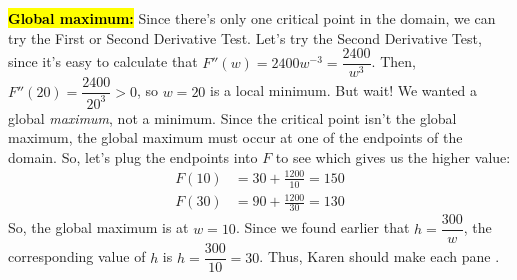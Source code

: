 \documentclass{article}
\newcommand{\highlight}[1]{\boldmath\hl{\textbf{#1}}\unboldmath}
\theoremstyle{theorem}
\begin{document}
\begin{enumerate}
\begin{solution}
    \highlight{Global maximum:} Since there's only one critical point in the domain, we can try the First or Second Derivative Test. Let's try the Second Derivative Test, since it's easy to calculate that $F''(w) = 2400 w^{-3} = \dfrac{2400}{w^3}$. Then, $F''(20) = \dfrac{2400}{20^3} > 0$, so $w = 20$ is a local minimum. But wait! We wanted a global \emph{maximum}, not a minimum. Since the critical point isn't the global maximum, the global maximum must occur at one of the endpoints of the domain. So, let's plug the endpoints into $F$ to see which gives us the higher value:
    \begin{align*}
      F(10) &= 30 + \frac{1200}{10} = 150 \\
      F(30) &= 90 + \frac{1200}{30} = 130
    \end{align*}
    So, the global maximum is at $w = 10$. Since we found earlier that $h = \dfrac{300}{w}$, the corresponding value of $h$ is $h = \dfrac{300}{10} = 30$. Thus, Karen should make each pane . 
  \end{solution} 

\end{enumerate}
\end{document}
